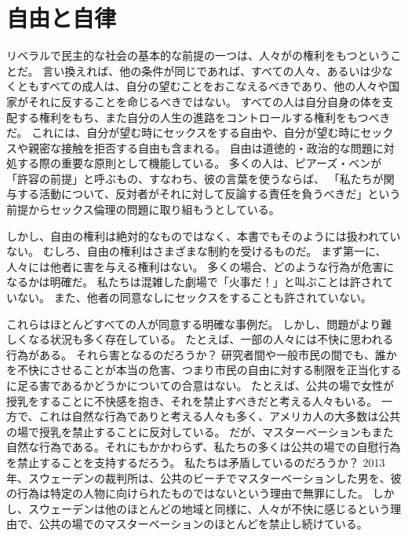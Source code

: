 \documentclass[paper=a4,book,openany]{jlreq}
\begin{document}
\section{自由と自律}

リベラルで民主的な社会の基本的な前提の一つは、人々がの権利をもつということだ。
言い換えれば、他の条件が同じであれば、すべての人々、あるいは少なくともすべての成人は、自分の望むことをおこなえるべきであり、他の人々や国家がそれに反することを命じるべきではない。
すべての人は自分自身の体を支配する権利をもち、また自分の人生の進路をコントロールする権利をもつべきだ。
これには、自分が望む時にセックスをする自由や、自分が望む時にセックスや親密な接触を拒否する自由も含まれる。
自由は道徳的・政治的な問題に対処する際の重要な原則として機能している。
多くの人は、ピアーズ・ベンが「許容の前提」と呼ぶもの、すなわち、彼の言葉を使うならば、
「私たちが関与する活動について、反対者がそれに対して反論する責任を負うべきだ」\citep[p.237]{benn99:_is_sex_moral_special}という前提からセックス倫理の問題に取り組もうとしている。

しかし、自由の権利は絶対的なものではなく、本書でもそのようには扱われていない。
むしろ、自由の権利はさまざまな制約を受けるものだ。
まず第一に、人々には他者に害を与える権利はない。
多くの場合、どのような行為が危害になるかは明確だ。
私たちは混雑した劇場で「火事だ！」と叫ぶことは許されていない。
また、他者の同意なしにセックスをすることも許されていない。

これらはほとんどすべての人が同意する明確な事例だ。
しかし、問題がより難しくなる状況も多く存在している。
たとえば、一部の人々には不快に思われる行為がある。
それら害となるのだろうか？ 研究者間や一般市民の間でも、誰かを不快にさせることが本当の危害、つまり市民の自由に対する制限を正当化するに足る害であるかどうかについての合意はない。
たとえば、公共の場で女性が授乳をすることに不快感を抱き、それを禁止すべきだと考える人々もいる。
一方で、これは自然な行為でありと考える人々も多く、アメリカ人の大多数は公共の場で授乳を禁止することに反対している\citep{cdc08:_public_opinion_breas}。
だが、マスターベーションもまた自然な行為である。それにもかかわらず、私たちの多くは公共の場での自慰行為を禁止することを支持するだろう。
私たちは矛盾しているのだろうか？ 2013年、スウェーデンの裁判所は、公共のビーチでマスターベーションした男を、彼の行為は特定の人物に向けられたものではないという理由で無罪にした\citep{ederyd13:_you_cant_just_walk_aroun}。
しかし、スウェーデンは他のほとんどの地域と同様に、人々が不快に感じるという理由で、公共の場でのマスターベーションのほとんどを禁止し続けている。
\end{document}
